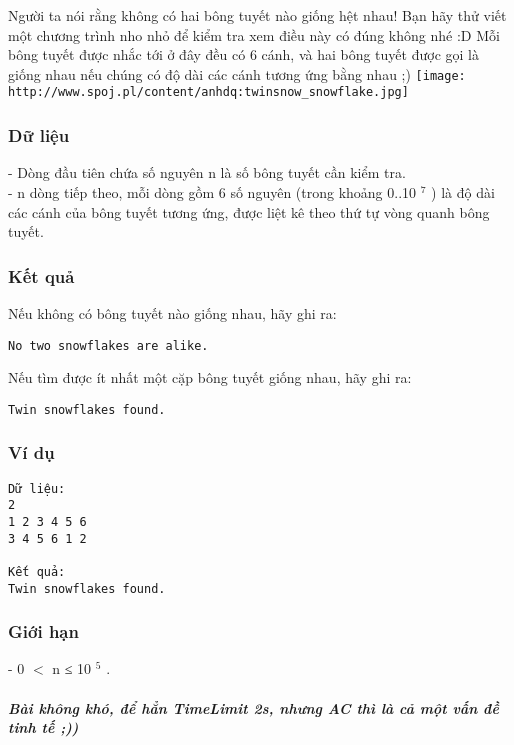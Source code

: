 



   Người ta nói rằng không có hai bông tuyết nào giống hệt nhau! Bạn hãy thử viết một chương trình nho nhỏ để kiểm tra xem điều này có đúng không nhé :D Mỗi bông tuyết được nhắc tới ở đây đều có 6 cánh, và hai bông tuyết được gọi là giống nhau nếu chúng có độ dài các cánh tương ứng bằng nhau ;)  
\texttt{[image: http://www.spoj.pl/content/anhdq:twinsnow\_snowflake.jpg]}

\subsubsection{   Dữ liệu  }

   - Dòng đầu tiên chứa số nguyên n là số bông tuyết cần kiểm tra.   
\\   - n dòng tiếp theo, mỗi dòng gồm 6 số nguyên (trong khoảng 0..10   $^    7   $   ) là độ dài các cánh của bông tuyết tương ứng, được liệt kê theo thứ tự vòng quanh bông tuyết.  

\subsubsection{   Kết quả  }

   Nếu không có bông tuyết nào giống nhau, hãy ghi ra:  
\begin{verbatim}
No two snowflakes are alike.\end{verbatim}

   Nếu tìm được ít nhất một cặp bông tuyết giống nhau, hãy ghi ra:  
\begin{verbatim}
Twin snowflakes found.\end{verbatim}

\subsubsection{   Ví dụ  }
\begin{verbatim}
Dữ liệu:
2
1 2 3 4 5 6
3 4 5 6 1 2

Kết quả:
Twin snowflakes found.
\end{verbatim}

\subsubsection{   Giới hạn  }

   - 0 $<$ n ≤ 10   $^    5   $   .  

\paragraph{\textit{    Bài không khó, để hẳn TimeLimit 2s, nhưng AC thì là cả một vấn đề tinh tế ;))   }}